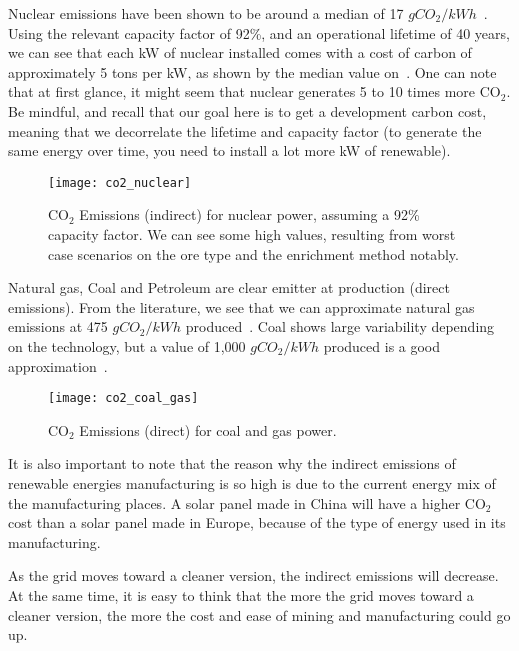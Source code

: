 Nuclear emissions have been shown to be around a median of 17 $gCO_2/kWh$~. Using the relevant capacity factor of 92\%, and an operational lifetime of 40 years, we can see that each kW of nuclear installed comes with a cost of carbon of approximately 
5 tons per kW, as shown by the median value on~. One can note that at first glance, it might seem that nuclear generates 5 to 10 times more $\mathrm{CO_2}$. Be mindful, and recall that our goal here is to get a development carbon cost, meaning that we decorrelate the lifetime and capacity factor (to generate the same energy over time, you need to install a lot more kW of renewable).

\begin{figure}[h]
	\texttt{[image: co2\_nuclear]}
	\caption[$\mathrm{CO_2}$ Emissions (indirect) for nuclear power.]{$\mathrm{CO_2}$ Emissions (indirect) for nuclear power, assuming a 92\% capacity factor. We can see some high values, resulting from worst case scenarios on the ore type and the enrichment method notably.}
\end{figure}

Natural gas, Coal and Petroleum are clear emitter at production (direct emissions). From the literature, we see that we can approximate natural gas emissions at 475 $gCO_2/kWh$ produced~. Coal shows large variability depending on the technology, but a value of 1,000 $gCO_2/kWh$ produced is a good approximation~.


\begin{figure}[h]
	\texttt{[image: co2\_coal\_gas]}
	\caption[$\mathrm{CO_2}$ Emissions (direct) for coal and gas power.]{$\mathrm{CO_2}$ Emissions (direct) for coal and gas power.}
\end{figure}


\begin{kaobox}[frametitle=Indirect emissions\ldots until a cleaner grid?]

It is also important to note that the reason why the indirect emissions of renewable energies manufacturing is so high is due to the current energy mix of the manufacturing places. A solar panel made in China will have a higher $\mathrm{CO_2}$ cost than a solar panel made in Europe, because of the type of energy used in its manufacturing.

As the grid moves toward a cleaner version, the indirect emissions will decrease. At the same time, it is easy to think that the more the grid moves toward a cleaner version, the more the cost and ease of mining and manufacturing could go up.

\end{kaobox}


